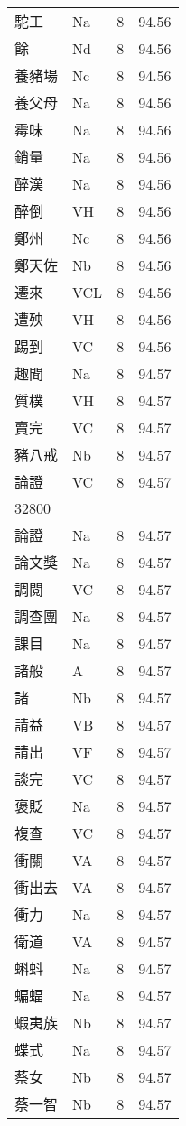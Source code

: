 \documentclass[twocolumn]{book}
\begin{document}
\begin{supertabular}{llrr}
駝工 & Na & 8 &  94.56\\
餘 & Nd & 8 &  94.56\\
養豬場 & Nc & 8 &  94.56\\
養父母 & Na & 8 &  94.56\\
霉味 & Na & 8 &  94.56\\
銷量 & Na & 8 &  94.56\\
醉漢 & Na & 8 &  94.56\\
醉倒 & VH & 8 &  94.56\\
鄭州 & Nc & 8 &  94.56\\
鄭天佐 & Nb & 8 &  94.56\\
遷來 & VCL & 8 &  94.56\\
遭殃 & VH & 8 &  94.56\\
踢到 & VC & 8 &  94.56\\
趣聞 & Na & 8 &  94.57\\
質樸 & VH & 8 &  94.57\\
賣完 & VC & 8 &  94.57\\
豬八戒 & Nb & 8 &  94.57\\
論證 & VC & 8 &  94.57\\
32800\\
論證 & Na & 8 &  94.57\\
論文獎 & Na & 8 &  94.57\\
調閱 & VC & 8 &  94.57\\
調查團 & Na & 8 &  94.57\\
課目 & Na & 8 &  94.57\\
諸般 & A & 8 &  94.57\\
諸 & Nb & 8 &  94.57\\
請益 & VB & 8 &  94.57\\
請出 & VF & 8 &  94.57\\
談完 & VC & 8 &  94.57\\
褒貶 & Na & 8 &  94.57\\
複查 & VC & 8 &  94.57\\
衝關 & VA & 8 &  94.57\\
衝出去 & VA & 8 &  94.57\\
衝力 & Na & 8 &  94.57\\
衛道 & VA & 8 &  94.57\\
蝌蚪 & Na & 8 &  94.57\\
蝙蝠 & Na & 8 &  94.57\\
蝦夷族 & Nb & 8 &  94.57\\
蝶式 & Na & 8 &  94.57\\
蔡女 & Nb & 8 &  94.57\\
蔡一智 & Nb & 8 &  94.57\\

\end{supertabular}
\end{document}
